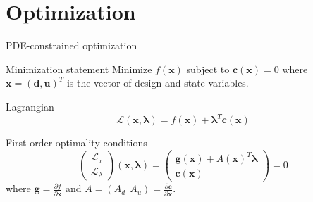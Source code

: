\documentclass{beamer}
\begin{document}
\def\uu{\bm u}
\def\LL{\mathcal L}
\def\di{\partial}
\section{Optimization}
\begin{frame}{PDE-constrained optimization}
  \begin{block}{Minimization statement}
    Minimize $f(\bm x)$ subject to $\bm c(\bm x) = 0$ where $\bm x =
    (\bm d,\uu)^T$ is the vector of design and state variables.
  \end{block}
  \begin{block}{Lagrangian}
    \begin{equation*}
      \LL(\bm x,\bm \lambda) = f(\bm x) + \bm \lambda^T \bm c(\bm x)
    \end{equation*}
  \end{block}
  \begin{block}{First order optimality conditions}
    \begin{equation*}
      \begin{pmatrix}
        \LL_x \\
        \LL_\lambda
      \end{pmatrix}
      (\bm x,\bm \lambda) =
      \begin{pmatrix}
        \bm g (\bm x) + A(\bm x)^T \bm \lambda \\
        \bm c(\bm x)
      \end{pmatrix}
      = 0
    \end{equation*}
    where $\bm g = \frac{\di f}{\di \bm x}$ and $A = (A_d \ \ A_u) = \frac{\di \bm c}{\di \bm x}$.
  \end{block}
\end{frame}
\end{document}
